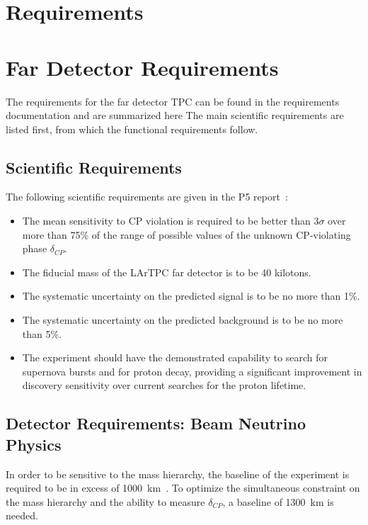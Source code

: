 \section{Requirements}

\section{Far Detector Requirements}

The requirements for the far detector TPC can be found in the requirements
documentation \cite{lar-fd-req} and are summarized here  The main scientific requirements
are listed first, from which the functional requirements follow.

\subsection{Scientific Requirements}

The following scientific requirements are given in the P5
report~\cite{p5report}:

\begin{itemize}
\item The mean sensitivity to CP violation is required to be better
  than $3\sigma$ over more than 75\% of the range of possible values
  of the unknown CP-violating phase $\delta_{CP}$.
\item The fiducial mass of the LArTPC far detector is to be 40
  kilotons.
\item The systematic uncertainty on the predicted signal is to be no
  more than 1\%.
\item The systematic uncertainty on the predicted background is to be
  no more than 5\%.
\item The experiment should have the demonstrated capability to search
  for supernova bursts and for proton decay, providing a significant
  improvement in discovery sensitivity over current searches for the
  proton lifetime.
\end{itemize}

\subsection{Detector Requirements: Beam Neutrino Physics}

In order to be sensitive to the mass hierarchy, the baseline of the
experiment is required to be in excess of
1000~km~\cite{sci-opp,baselineprd}.  To optimize the simultaneous
constraint on the mass hierarchy and the ability to measure
$\delta_{CP}$, a baseline of 1300~km is needed.

